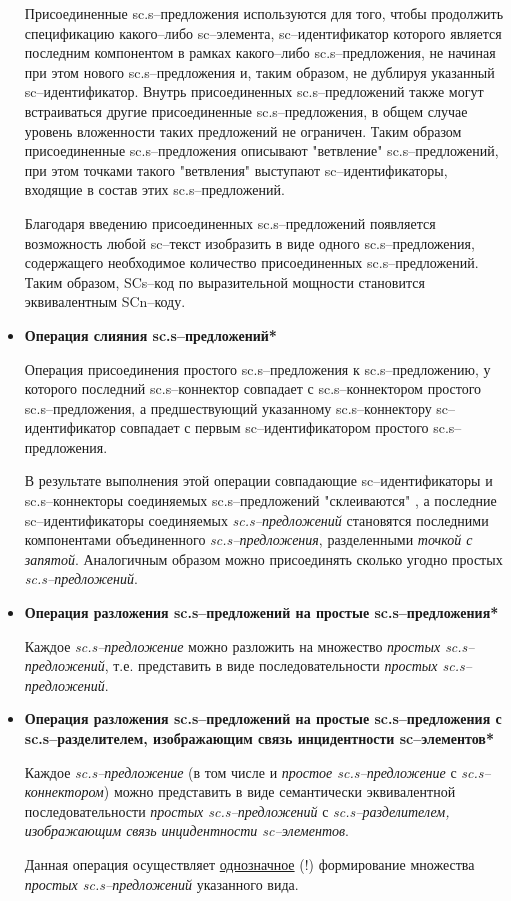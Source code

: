 \begin{itemize}
{		Присоединенные sc.s--предложения используются для того, чтобы продолжить спецификацию какого--либо sc--элемента, sc--идентификатор которого является последним компонентом в рамках какого--либо sc.s--предложения, не начиная при этом нового sc.s--предложения и, таким образом, не дублируя указанный \mbox{sc--идентификатор}. Внутрь присоединенных sc.s--предложений также могут встраиваться другие присоединенные sc.s--предложения, в общем случае уровень вложенности таких предложений не ограничен. Таким образом присоединенные sc.s--предложения описывают "ветвление"{} sc.s--предложений, при этом точками такого "ветвления"{} выступают sc--идентификаторы, входящие в состав этих sc.s--предложений.
		
		Благодаря введению присоединенных sc.s--предложений появляется возможность любой sc--текст изобразить в виде одного sc.s--предложения, содержащего необходимое количество присоединенных sc.s--предложений. Таким образом, SCs--код по выразительной мощности становится эквивалентным SCn--коду.}
	\item{\textbf{Операция слияния sc.s--предложений*}
		
		Операция присоединения простого sc.s--предложения к sc.s--предложению, у которого последний sc.s--коннектор совпадает с sc.s--коннектором простого sc.s--предложения, а предшествующий указанному sc.s--коннектору sc--идентификатор совпадает с первым sc--идентификатором простого sc.s--предложения.
		
		В результате выполнения этой операции совпадающие sc--идентификаторы и sc.s--коннекторы соединяемых sc.s--предложений "склеиваются"{} , а последние sc--идентификаторы соединяемых \textit{sc.s--предложений} становятся последними компонентами объединенного \textit{sc.s--предложения},
		разделенными \textit{точкой с запятой}. Аналогичным образом можно присоединять сколько угодно простых \textit{sc.s--предложений}.}
	\item{\textbf{Операция разложения sc.s--предложений на простые sc.s--предложения*}
		
		Каждое \textit{sc.s--предложение} можно разложить на множество \textit{простых sc.s--предложений}, т.е. представить в виде последовательности \textit{простых sc.s--предложений}.}
	\item{\textbf{Операция разложения sc.s--предложений на простые sc.s--предложения с sc.s--разделителем, изображающим связь инцидентности sc--элементов*}
		
		Каждое \textit{sc.s--предложение} (в том числе и \textit{простое sc.s--предложение} с \textit{sc.s--коннектором}) можно представить в виде семантически эквивалентной последовательности \textit{простых \mbox{sc.s--предложений}} с \textit{sc.s--разделителем, изображающим связь инцидентности \mbox{sc--элементов}}.
		
		Данная операция осуществляет \uline{однозначное} (!) формирование множества \textit{простых \mbox{sc.s--предложений}} указанного вида.}
\end{itemize}

